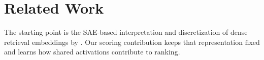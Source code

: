 \section{Related Work}
The starting point is the SAE-based interpretation and discretization of dense
retrieval embeddings by \citet{park-etal-2025-decoding}. Our scoring contribution
keeps that representation fixed and learns how shared activations contribute
to ranking.
